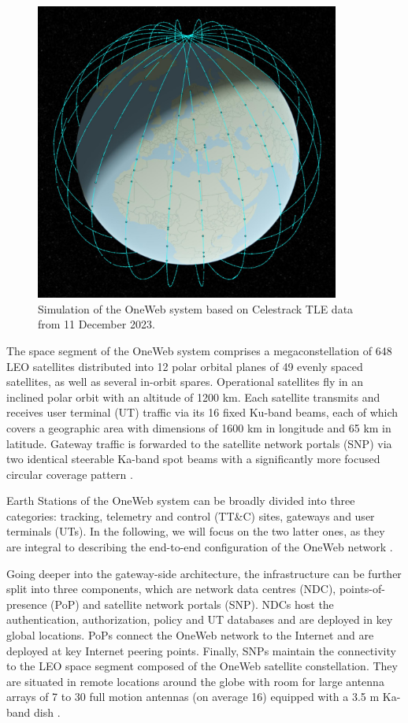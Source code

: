 \documentclass[english, 12pt, a4paper, elec, utf8, a-1b, online]{aaltothesis}
\begin{document}
\begin{figure}[h]
  \centering
  \includegraphics[width=100mm]{figures/oneweb-tle-2023-12-11-compressed.jpg}
  \caption{Simulation of the OneWeb system based on Celestrack TLE data from 11 December 2023.}
  \label{fig-oneweb-tle-2023-12-11}
\end{figure}

The space segment of the OneWeb system comprises a megaconstellation of 648 LEO satellites distributed into 12 polar orbital planes of 49 evenly spaced satellites, as well as several in-orbit spares. 
Operational satellites fly in an inclined polar orbit with an altitude of 1200 km.
Each satellite transmits and receives user terminal (UT) traffic via its 16 fixed Ku-band beams, each of which covers a geographic area with dimensions of 1600 km in longitude and 65 km in latitude.
Gateway traffic is forwarded to the satellite network portals (SNP) via two identical steerable Ka-band spot beams with a significantly more focused circular coverage pattern \cite{henri2020oneweb, worldvu2016loi}.

Earth Stations of the OneWeb system can be broadly divided into three categories: tracking, telemetry and control (TT\&C) sites, gateways and user terminals (UTs).
In the following, we will focus on the two latter ones, as they are integral to describing the end-to-end configuration of the OneWeb network \cite{worldvu2016loi}.

Going deeper into the gateway-side architecture, the infrastructure can be further split into three components, which are network data centres (NDC), points-of-presence (PoP) and satellite network portals (SNP).
NDCs host the authentication, authorization, policy and UT databases and are deployed in key global locations.
PoPs connect the OneWeb network to the Internet and are deployed at key Internet peering points.
Finally, SNPs maintain the connectivity to the LEO space segment composed of the OneWeb satellite constellation.
They are situated in remote locations around the globe with room for large antenna arrays of 7 to 30 full motion antennas (on average 16) equipped with a 3.5 m Ka-band dish \cite{henri2020oneweb}.
\end{document}
